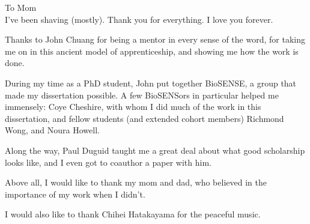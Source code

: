 \begin{frontmatter}

\begin{dedication}
\null\vfil
\begin{center}


To Mom\\\vspace{12pt}
I've been shaving (mostly).
Thank you for everything.
I love you forever.
\end{center}
\vfil\null
\end{dedication}


\tableofcontents
\clearpage
\listoffigures
\clearpage
\listoftables

\begin{acknowledgements}
Thanks to John Chuang for being a mentor in every sense of the word, for taking
me on in this ancient model of apprenticeship, and showing me how the work is
done.

During my time as a PhD student, John put together BioSENSE, a group that made
my dissertation possible. A few BioSENSors in particular helped me immensely:
Coye Cheshire, with whom I did much of the work in this dissertation, and fellow
students (and extended cohort members) Richmond Wong, and Noura Howell.

Along the way, Paul Duguid taught me a great deal about what good scholarship
looks like, and I even got to coauthor a paper with him.

Above all, I would like to thank my mom and dad, who believed in the importance
of my work when I didn't.

I would also like to thank Chihei Hatakayama for the peaceful music.
\end{acknowledgements}





\end{frontmatter}
